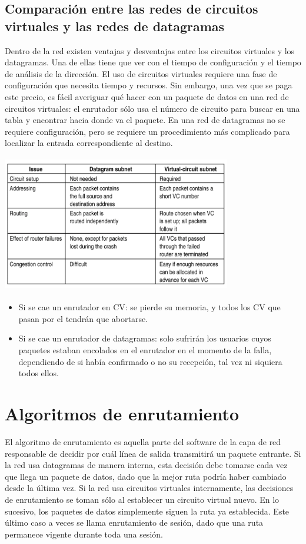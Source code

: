 \documentclass[10pt,a4paper]{report}
\begin{document}
\subsection{Comparación entre las redes de circuitos virtuales y las redes de datagramas}
	Dentro de la red existen ventajas y desventajas entre los circuitos virtuales y los 
	datagramas. Una de ellas tiene que ver con el tiempo de configuración y el tiempo de 
	análisis de la dirección. El uso de circuitos virtuales requiere una fase de 
	configuración que necesita tiempo y recursos. Sin embargo, una vez que se paga 
	este precio, es fácil averiguar qué hacer con un paquete de datos en una red de 
	circuitos virtuales: el enrutador sólo usa el número de circuito para buscar en una 
	tabla y encontrar hacia donde va el paquete. En una red de datagramas no se 
	requiere configuración, pero se requiere un procedimiento más complicado para 
	localizar la entrada correspondiente al destino.

	\begin{center} 
		\includegraphics[width=10cm, height=6cm]{./imagenes/comparacion.png}
	\end{center}
	
	\begin{itemize}
		\item Si se cae un enrutador en CV: se pierde su memoria, y todos los CV que 
		pasan por el tendrán que abortarse.
		\item Si se cae un enrutador de datagramas: solo sufrirán los usuarios cuyos 
		paquetes estaban encolados en el enrutador en el momento de la falla, 
		dependiendo de si había confirmado o no su recepción, tal vez ni siquiera todos 
		ellos.
	\end{itemize}


\section{Algoritmos de enrutamiento}
	\par El algoritmo de enrutamiento es aquella parte del software de la capa de red 
	responsable de decidir por cuál línea de salida transmitirá un paquete entrante. Si la 
	red usa datagramas de manera interna, esta decisión debe tomarse cada vez que 
	llega un paquete de datos, dado que la mejor ruta podría haber cambiado desde la 
	última vez. Si la red usa circuitos virtuales internamente, las decisiones de 
	enrutamiento se toman sólo al establecer un circuito virtual nuevo. En lo sucesivo, 
	los paquetes de datos simplemente siguen la ruta ya establecida. Este último caso a 
	veces se llama enrutamiento de sesión, dado que una ruta permanece vigente 
	durante toda una sesión.
	
\end{document}
